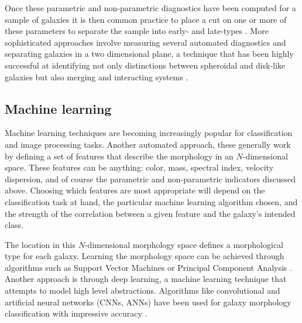 Once these parametric and non-parametric diagnostics have been computed for a sample of galaxies it is then common practice to place a cut on one or more of these parameters to separate the sample into early- and late-types \citep{Shen2003}. More sophisticated approaches involve measuring several automated diagnostics and separating galaxies in a two dimensional plane, a technique that has been highly successful at identifying not only distinctions between spheroidal and disk-like galaxies but also merging and interacting systems \citep{Lotz2004, Conselice2000, Conselice2003,Freeman2013}. 




\subsection{Machine learning}
\label{chap1: machine learning}

Machine learning techniques are becoming increasingly popular for classification and image processing tasks. Another automated approach, these generally work by defining a set of features that describe the morphology in an $N$-dimensional space. These features can be anything: color, mass, spectral index, velocity dispersion, and of course the parametric and non-parametric indicators discussed above. Choosing which features are most appropriate will depend on the classification task at hand, the particular machine learning algorithm chosen, and the strength of the correlation between a given feature and the galaxy's intended class. 

The location in this $N$-dimensional morphology space defines a morphological type for each galaxy. Learning the morphology space can be achieved through algorithms such as Support Vector Machines \citep{HuertasCompany2008} or Principal Component Analysis \citep{Watanabe1985, Conselice2006, Scarlata2007, Peth2016}. Another approach is through deep learning, a machine learning technique that attempts to model high level abstractions. Algorithms like convolutional and artificial neural networks (CNNs, ANNs) have been used for galaxy morphology classification with impressive accuracy \citep{Ball2004, 	Banerji2010, Dieleman2015, HuertasCompany2015,DominguezSanchez2017}. 

